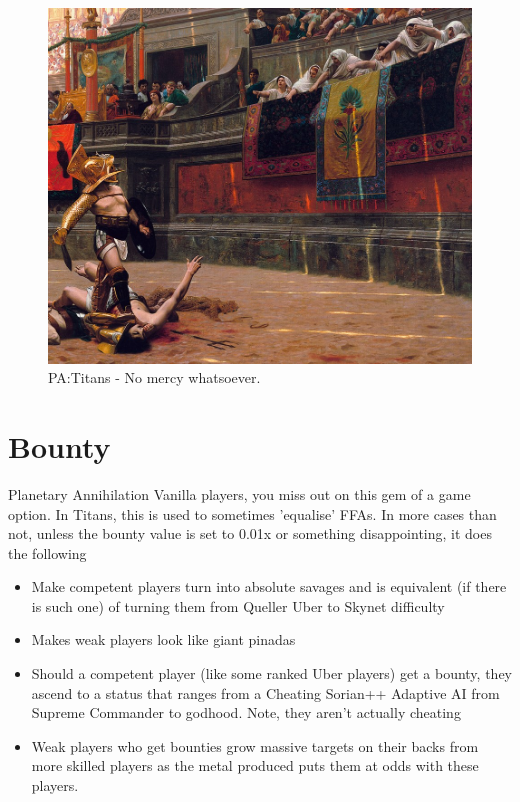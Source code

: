 \documentclass[]{article}
\begin{document}
\begin{figure}[h]
	\centering
	\includegraphics[width=\linewidth]{NtpMQAd}
	\caption{PA:Titans - No mercy whatsoever.}
	\label{fig:ntpmqad}
\end{figure}


\newpage
\newpage
\section{Bounty}

Planetary Annihilation Vanilla players, you miss out on this gem of a game option.  In Titans, this is used to sometimes 'equalise' FFAs.  In more cases than not, unless the bounty value is set to 0.01x or something disappointing, it does the following
\begin{itemize}
	\item Make competent players turn into absolute savages and is equivalent (if there is such one) of turning them from Queller Uber to Skynet difficulty
	\item Makes weak players look like giant pinadas
	\item Should a competent player (like some ranked Uber players) get a bounty, they ascend to a status that ranges from a Cheating Sorian++ Adaptive AI from Supreme Commander to godhood.  Note, they aren't actually cheating
	\item Weak players who get bounties grow massive targets on their backs from more skilled players as the metal produced puts them at odds with these players.  
\end{itemize}
\end{document}
